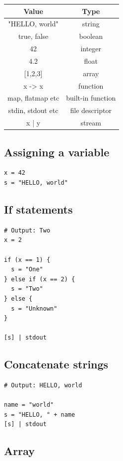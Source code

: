 \documentclass[12pt,a4paper]{article}
\begin{document}
\begin{center}
\begin{tabular}{|c|c|}
\hline
\textbf{Value} & \textbf{Type} \\
\hline
"HELLO, world" & string \\
true, false & boolean \\
42 & integer \\
4.2 & float \\
{[}1,2,3{]} & array \\
x -> x & function \\
map, flatmap etc & built-in function \\
stdin, stdout etc & file descriptor \\
x | y & stream \\
\hline
\end{tabular}
\end{center}

\subsection{Assigning a variable}

\begin{lstlisting}[style=streem]
x = 42
s = "HELLO, world"
\end{lstlisting}

\subsection{If statements}

\begin{lstlisting}[style=streem]
# Output: Two
x = 2

if (x == 1) {
  s = "One"
} else if (x == 2) {
  s = "Two"
} else {
  s = "Unknown"
}

[s] | stdout
\end{lstlisting}

\subsection{Concatenate strings}

\begin{lstlisting}[style=streem]
# Output: HELLO, world

name = "world"
s = "HELLO, " + name
[s] | stdout
\end{lstlisting}

\subsection{Array}
\end{document}
